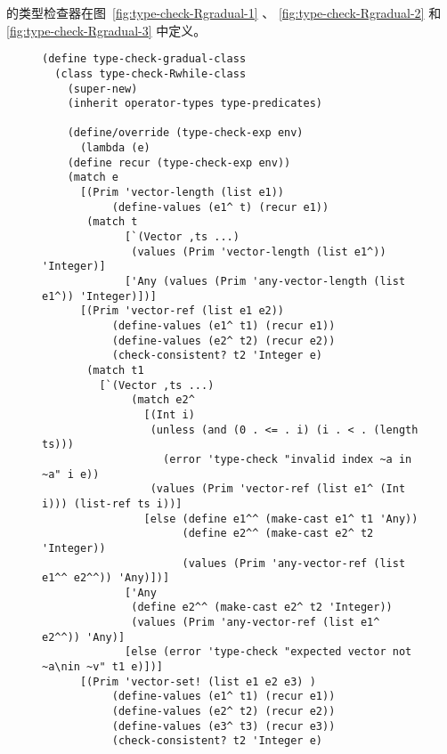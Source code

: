 \documentclass[11pt]{book}
\begin{document}
 \LangGrad{} 的类型检查器在图~\ref{fig:type-check-Rgradual-1} 、 \ref{fig:type-check-Rgradual-2} 和 \ref{fig:type-check-Rgradual-3} 中定义。


\begin{figure}[tbp]
\begin{lstlisting}
(define type-check-gradual-class
  (class type-check-Rwhile-class
    (super-new)
    (inherit operator-types type-predicates)

    (define/override (type-check-exp env)
      (lambda (e)
	(define recur (type-check-exp env))
	(match e
	  [(Prim 'vector-length (list e1))
           (define-values (e1^ t) (recur e1))
	   (match t
             [`(Vector ,ts ...)
              (values (Prim 'vector-length (list e1^)) 'Integer)]
             ['Any (values (Prim 'any-vector-length (list e1^)) 'Integer)])]
	  [(Prim 'vector-ref (list e1 e2))
           (define-values (e1^ t1) (recur e1))
           (define-values (e2^ t2) (recur e2))
           (check-consistent? t2 'Integer e)
	   (match t1
	     [`(Vector ,ts ...)
              (match e2^
                [(Int i)
                 (unless (and (0 . <= . i) (i . < . (length ts)))
                   (error 'type-check "invalid index ~a in ~a" i e))
                 (values (Prim 'vector-ref (list e1^ (Int i))) (list-ref ts i))]
                [else (define e1^^ (make-cast e1^ t1 'Any))
                      (define e2^^ (make-cast e2^ t2 'Integer))
                      (values (Prim 'any-vector-ref (list e1^^ e2^^)) 'Any)])]
             ['Any
              (define e2^^ (make-cast e2^ t2 'Integer))
              (values (Prim 'any-vector-ref (list e1^ e2^^)) 'Any)]
             [else (error 'type-check "expected vector not ~a\nin ~v" t1 e)])]
	  [(Prim 'vector-set! (list e1 e2 e3) )
           (define-values (e1^ t1) (recur e1))
           (define-values (e2^ t2) (recur e2))
           (define-values (e3^ t3) (recur e3))
           (check-consistent? t2 'Integer e)
\end{lstlisting}
\end{figure}
\end{document}
